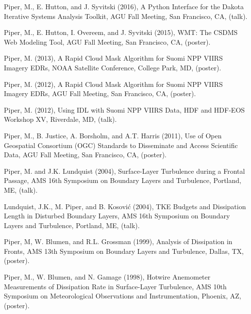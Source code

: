 \documentclass[letterpaper]{resume}
\begin{document}
\begin{enumerate}[{[}1{]}]

  \item Piper, M., E. Hutton, and J. Syvitski (2016), A Python
    Interface for the Dakota Iterative Systems Analysis Toolkit, AGU
    Fall Meeting, San Francisco, CA, (talk).

  \item Piper, M., E. Hutton, I. Overeem, and J. Syvitski (2015),
    {WMT}: The {CSDMS} Web Modeling Tool, AGU Fall Meeting, San
    Francisco, CA, (poster).

  \item Piper, M. (2013), A Rapid Cloud Mask Algorithm for {Suomi}
    {NPP} {VIIRS} {Imagery} {EDRs}, NOAA Satellite Conference, College
    Park, MD, (poster).

  \item Piper, M. (2012), {A Rapid Cloud Mask Algorithm for {Suomi}
    {NPP} {VIIRS} {Imagery} {EDRs}}, AGU Fall Meeting, San Francisco,
    CA, (poster).

  \item Piper, M. (2012), {Using IDL with {Suomi} {NPP} {VIIRS} Data},
    HDF and HDF-EOS Workshop XV, Riverdale, MD, (talk).

  \item Piper, M., B. Justice, A. Borsholm, and A.T. Harris (2011),
    Use of Open Geospatial Consortium (OGC) Standards to Disseminate
    and Access Scientific Data, AGU Fall Meeting, San Francisco, CA,
    (poster).

  \item Piper, M. and J.K. Lundquist (2004), Surface-Layer Turbulence
    during a Frontal Passage, AMS 16th Symposium on Boundary Layers
    and Turbulence, Portland, ME, (talk).

  \item Lundquist, J.K., M. Piper, and B. Kosovi{\'c} (2004), TKE
    Budgets and Dissipation Length in Disturbed Boundary Layers, AMS
    16th Symposium on Boundary Layers and Turbulence, Portland, ME,
    (talk).

  \item Piper, M, W. Blumen, and R.L. Grossman (1999), Analysis
    of Dissipation in Fronts, AMS 13th Symposium on Boundary Layers
    and Turbulence, Dallas, TX, (poster).

  \item Piper, M., W. Blumen, and N. Gamage (1998), Hotwire
    Anemometer Measurements of Dissipation Rate in Surface-Layer
    Turbulence, AMS 10th Symposium on Meteorological Observations
    and Instrumentation, Phoenix, AZ, (poster).


\end{enumerate}
\end{document}
